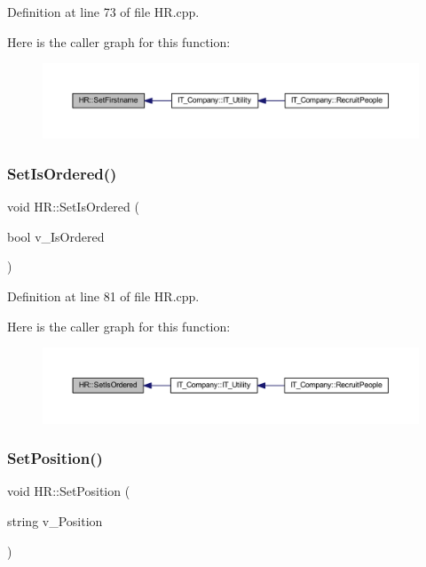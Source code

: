 Definition at line 73 of file H\+R.\+cpp.

Here is the caller graph for this function\+:
\nopagebreak
\begin{figure}[H]
\begin{center}
\leavevmode
\includegraphics[width=350pt]{class_h_r_a795d089594c22910ea58938faf131b67_icgraph}
\end{center}
\end{figure}
\mbox{\label{class_h_r_ac927323d22c1580b0b6d258e28294322}} 
\subsubsection{\texorpdfstring{Set\+Is\+Ordered()}{SetIsOrdered()}}
{\footnotesize\ttfamily void H\+R\+::\+Set\+Is\+Ordered (\begin{DoxyParamCaption}\item[{bool}]{v\+\_\+\+Is\+Ordered }\end{DoxyParamCaption})}



Definition at line 81 of file H\+R.\+cpp.

Here is the caller graph for this function\+:
\nopagebreak
\begin{figure}[H]
\begin{center}
\leavevmode
\includegraphics[width=350pt]{class_h_r_ac927323d22c1580b0b6d258e28294322_icgraph}
\end{center}
\end{figure}
\mbox{\label{class_h_r_ae092262d1dc245604fdb37fbe5564362}} 
\subsubsection{\texorpdfstring{Set\+Position()}{SetPosition()}}
{\footnotesize\ttfamily void H\+R\+::\+Set\+Position (\begin{DoxyParamCaption}\item[{string}]{v\+\_\+\+Position }\end{DoxyParamCaption})}



